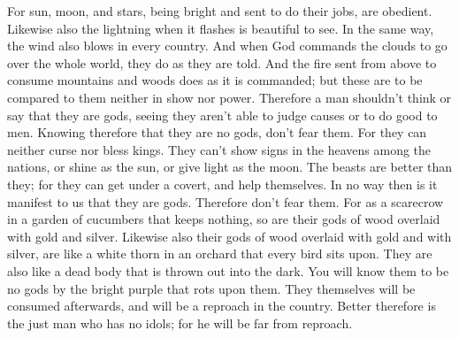  For sun, moon, and stars, being bright and sent to do
their jobs, are obedient.  Likewise also the lightning
when it flashes is beautiful to see. In the same way, the wind also
blows in every country.  And when God commands the clouds
to go over the whole world, they do as they are told. 
And the fire sent from above to consume mountains and woods does as it
is commanded; but these are to be compared to them neither in show nor
power.  Therefore a man shouldn't think or say that they
are gods, seeing they aren't able to judge causes or to do good to men.
 Knowing therefore that they are no gods, don't fear
them.  For they can neither curse nor bless kings.
 They can't show signs in the heavens among the nations,
or shine as the sun, or give light as the moon.  The
beasts are better than they; for they can get under a covert, and help
themselves.  In no way then is it manifest to us that
they are gods. Therefore don't fear them.  For as a
scarecrow in a garden of cucumbers that keeps nothing, so are their gods
of wood overlaid with gold and silver.  Likewise also
their gods of wood overlaid with gold and with silver, are like a white
thorn in an orchard that every bird sits upon. They are also like a dead
body that is thrown out into the dark.  You will know
them to be no gods by the bright purple that rots upon them. They
themselves will be consumed afterwards, and will be a reproach in the
country.  Better therefore is the just man who has no
idols; for he will be far from reproach.
